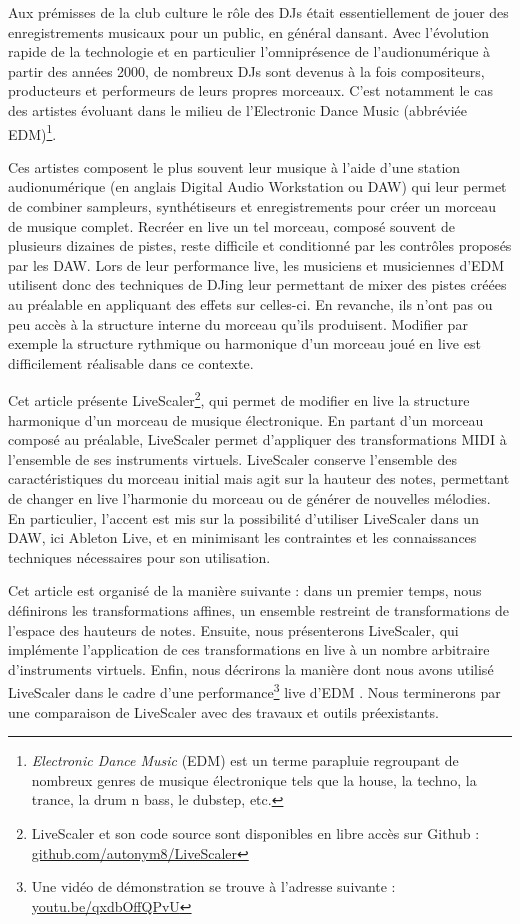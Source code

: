 Aux prémisses de la club culture le rôle des DJs était essentiellement de jouer des enregistrements musicaux pour un public, en général dansant. Avec l’évolution rapide de la technologie et en particulier l’omniprésence de l’audionumérique à partir des années 2000, de nombreux DJs sont devenus à la fois compositeurs, producteurs et performeurs de leurs propres morceaux. C'est notamment le cas des artistes évoluant dans le milieu de l'Electronic Dance Music (abbréviée EDM)\footnote{\emph{Electronic Dance Music} (EDM) est un terme parapluie regroupant de nombreux genres de musique électronique tels que la house, la techno, la trance, la drum n bass, le dubstep, etc. }.

Ces artistes composent le plus souvent leur musique à l’aide d’une station audionumérique (en anglais Digital Audio Workstation ou DAW) qui leur permet de combiner sampleurs, synthétiseurs et enregistrements pour créer un morceau de musique complet. Recréer en live un tel morceau, composé souvent de plusieurs dizaines de pistes, reste difficile et conditionné par les contrôles proposés par les DAW. Lors de leur performance live, les musiciens et musiciennes d’EDM utilisent donc des techniques de DJing leur permettant de mixer des pistes créées au préalable en appliquant des effets sur celles-ci. En revanche, ils n’ont pas ou peu accès à la structure interne du morceau qu’ils produisent. Modifier par exemple la structure rythmique ou harmonique d’un morceau joué en live est difficilement réalisable dans ce contexte. 

Cet article présente LiveScaler\footnote{LiveScaler et son code source sont disponibles en libre accès sur Github : \href{https://github.com/autonym8/LiveScaler}{github.com/autonym8/LiveScaler}}, qui permet de modifier en live la structure harmonique d'un morceau de musique électronique. En partant d'un morceau composé au préalable, LiveScaler permet d'appliquer des transformations MIDI à l'ensemble de ses instruments virtuels. LiveScaler conserve l'ensemble des caractéristiques du morceau initial mais agit sur la hauteur des notes, permettant de changer en live l'harmonie du morceau ou de générer de nouvelles mélodies. En particulier, l'accent est mis sur la possibilité d'utiliser LiveScaler dans un DAW, ici Ableton Live, et en minimisant les contraintes et les connaissances techniques nécessaires pour son utilisation.

Cet article est organisé de la manière suivante : dans un premier temps, nous définirons les transformations affines, un ensemble restreint de transformations de l'espace des hauteurs de notes. Ensuite, nous présenterons Live\-Scaler, qui implémente l'application de ces transformations en live à un nombre arbitraire d'instruments virtuels. Enfin, nous décrirons la manière dont nous avons utilisé LiveScaler dans le cadre d'une performance\footnote{Une vidéo de démonstration se trouve à l'adresse suivante : \href{https://youtu.be/qxdbOffQPvU}{youtu.be/qxdbOffQPvU}} live d'EDM . Nous terminerons par une comparaison de LiveScaler avec des travaux et outils préexistants.